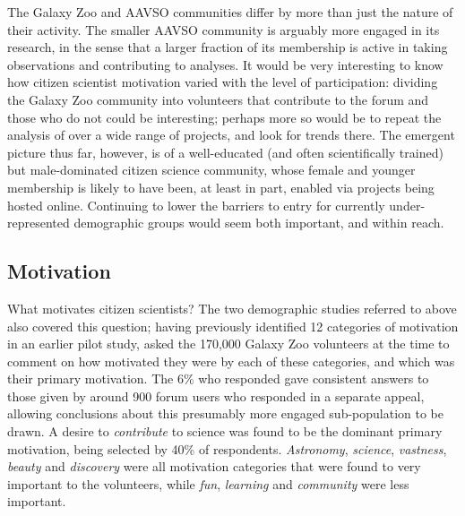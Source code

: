 \documentclass{ar2e}
\begin{document}
The Galaxy Zoo and AAVSO communities differ by more than just the nature of
their activity. The smaller AAVSO community is arguably more engaged in its
research, in the sense that a larger fraction of its membership is active in
taking observations and contributing to analyses. It would be very interesting
to know how citizen scientist motivation varied with the level of
participation: dividing the Galaxy Zoo community into volunteers that
contribute to the forum and those who do not could be interesting; perhaps
more so would be to repeat the analysis of \citeauthor{Rad++2013} over a wide
range of projects, and look for trends there. The emergent picture thus far,
however, is of a well-educated (and often scientifically trained)  but
male-dominated citizen science community, whose female and younger membership
is likely to have been, at least in part, enabled via projects being hosted
online. Continuing to lower the barriers to entry for currently
under-represented demographic groups would seem both important, and within
reach.



\subsection{Motivation}
\label{sec:crowd:motivation}

What motivates citizen scientists? The two demographic studies referred to above
also covered this question; having previously \citep{Rad++2010} identified 12
categories of motivation in an earlier pilot study, \citet{Rad++2013} asked the
170,000 Galaxy Zoo volunteers at the time to comment on how motivated they were
by each of these categories, and which was their primary motivation. The 6\% who
responded gave consistent answers to those given by around 900 forum users who
responded in a separate appeal, allowing conclusions about this presumably more
engaged sub-population to be drawn. A desire to {\it contribute} to science was
found to be the dominant primary motivation, being selected by 40\% of
respondents. {\it Astronomy}, {\it science}, {\it vastness}, {\it beauty} and 
{\it discovery} were all motivation categories that were found to very important
to the volunteers, while {\it fun}, {\it learning} and {\it community} were less
important. 
\end{document}
